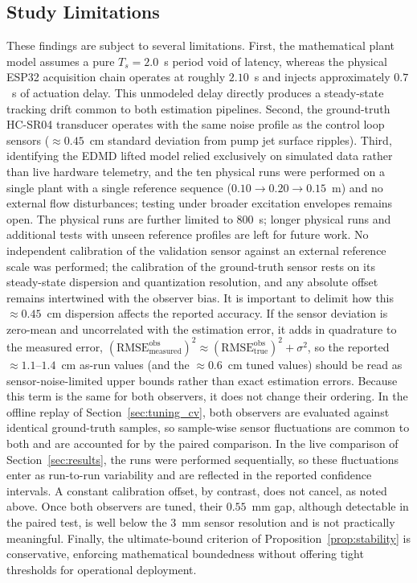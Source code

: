 \documentclass[asi,article,accept,pdftex,moreauthors]{Definitions/mdpi}
\newcommand{\rev}[1]{#1}%
\begin{document}
\subsection{Study Limitations}
\label{sec:limitations}

{These findings are subject to several limitations. First, the mathematical plant model assumes a pure $T_s=2.0$~s period void of latency, whereas the physical ESP32 acquisition chain operates at roughly $2.10$~s and injects approximately $0.7$~s of actuation delay. This unmodeled delay directly produces a steady-state tracking drift common to both estimation pipelines. Second, the ground-truth HC-SR04 transducer operates with the same noise profile as the control loop sensors ($\approx 0.45$~cm standard deviation from pump jet surface ripples). Third, identifying the EDMD lifted model relied exclusively on simulated data rather than live hardware telemetry, and the ten physical runs were performed on a single plant with a single reference sequence ($0.10\to0.20\to0.15$~m) and no external flow disturbances; testing under broader excitation envelopes remains open. The physical runs are further limited to $800$~s; longer physical runs and additional tests with unseen reference profiles are left for future work. No independent calibration of the validation sensor against an external reference scale was performed; the calibration of the ground-truth sensor rests on its steady-state dispersion and quantization resolution, and any absolute offset remains intertwined with the observer bias. \rev{It is important to delimit how this $\approx 0.45$~cm dispersion affects the reported accuracy. If the sensor deviation is zero-mean and uncorrelated with the estimation error, it adds in quadrature to the measured error, $(\mathrm{RMSE}^\mathrm{obs}_\mathrm{measured})^2 \approx (\mathrm{RMSE}^\mathrm{obs}_\mathrm{true})^2 + \sigma^2$, so the reported $\approx 1.1$--$1.4$~cm as-run values (and the $\approx 0.6$~cm tuned values) should be read as sensor-noise-limited upper bounds rather than exact estimation errors. Because this term is the same for both observers, it does not change their ordering. In the offline replay of Section~\ref{sec:tuning_cv}, both observers are evaluated against identical ground-truth samples, so sample-wise sensor fluctuations are common to both and are accounted for by the paired comparison. In the live comparison of Section~\ref{sec:results}, the runs were performed sequentially, so these fluctuations enter as run-to-run variability and are reflected in the reported confidence intervals. A constant calibration offset, by contrast, does not cancel, as noted above. Once both observers are tuned, their $0.55$~mm gap, although detectable in the paired test, is well below the $3$~mm sensor resolution and is not practically meaningful.} Finally, the ultimate-bound criterion of Proposition~\ref{prop:stability} is conservative, enforcing mathematical boundedness without offering tight thresholds for operational deployment.}
\end{document}
